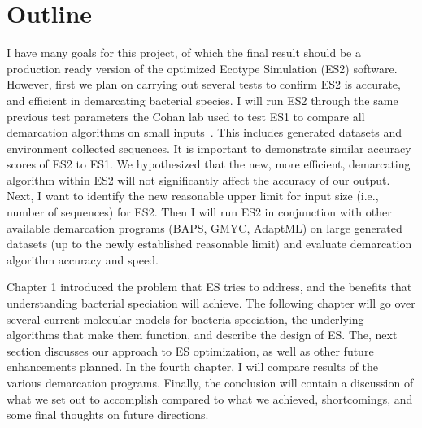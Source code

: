\section{Outline}
I have many goals for this project, of which the final result should be a production ready version of the optimized Ecotype Simulation (ES2) software.
However, first we plan on carrying out several tests to confirm ES2 is accurate, and efficient in demarcating bacterial species.
I will run ES2 through the same previous test parameters the Cohan lab used to test ES1 to compare all demarcation algorithms on small inputs~\cite{carlo}.
This includes generated datasets and environment collected sequences.
It is important to demonstrate similar accuracy scores of ES2 to ES1.
We hypothesized that the new, more efficient, demarcating algorithm within ES2 will not significantly affect the accuracy of our output.
Next, I want to identify the new reasonable upper limit for input size (i.e., number of sequences) for ES2.
Then I will run ES2 in conjunction with other available demarcation programs (BAPS, GMYC, AdaptML) on large generated datasets (up to the newly established reasonable limit) and evaluate demarcation algorithm accuracy and speed.

Chapter 1 introduced the problem that ES tries to address, and the benefits that understanding bacterial speciation will achieve.
The following chapter will go over several current molecular models for bacteria speciation, the underlying algorithms that make them function, and describe the design of ES.
The, next section discusses our approach to ES optimization, as well as other future enhancements planned.
In the fourth chapter, I will compare results of the various demarcation programs.
Finally, the conclusion will contain a discussion of what we set out to accomplish compared to what we achieved, shortcomings, and some final thoughts on future directions.

